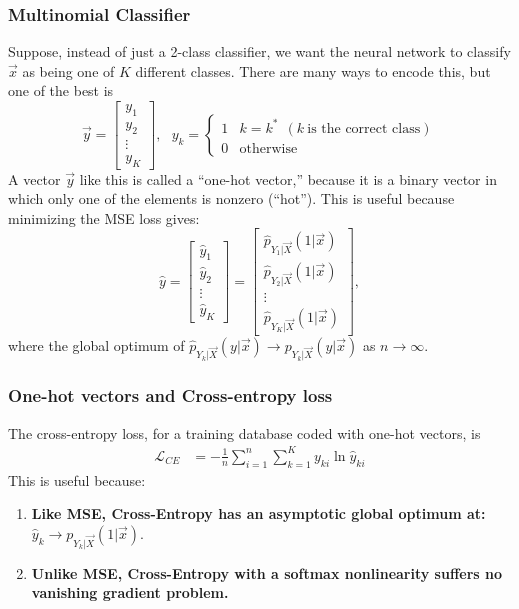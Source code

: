 \documentclass{beamer}
\begin{document}
\begin{frame}
  \frametitle{Multinomial Classifier}

  Suppose, instead of just a 2-class classifier, we want the neural
  network to classify $\vec{x}$ as being one of $K$ different classes.
  There are many ways to encode this, but one of the best is
  \begin{displaymath}
    \vec{y}=\left[\begin{array}{c}y_1\\y_2\\\vdots\\y_K\end{array}\right],~~~
    y_k=\begin{cases}1&k=k^*~~(k~\mbox{is the correct class})\\0&\mbox{otherwise}\end{cases}
  \end{displaymath}
  A vector $\vec{y}$ like this is called a ``one-hot vector,'' because
  it is a binary vector in which only one of the elements is nonzero (``hot'').
  This is useful  because minimizing the MSE loss gives:
  \begin{displaymath}
    \hat{y}=\left[\begin{array}{c}\hat{y}_1\\\hat{y}_2\\\vdots\\\hat{y}_K\end{array}\right]
    =\left[\begin{array}{c}
        \hat{p}_{Y_1|\vec{X}}(1|\vec{x})\\
        \hat{p}_{Y_2|\vec{X}}(1|\vec{x})\\
        \vdots\\
        \hat{p}_{Y_K|\vec{X}}(1|\vec{x})
        \end{array}\right],
  \end{displaymath}
  where the global optimum of
  $\hat{p}_{Y_k|\vec{X}}(y|\vec{x})\rightarrow
  p_{Y_k|\vec{X}}(y|\vec{x})$ as $n\rightarrow\infty$.
\end{frame}

\begin{frame}
  \frametitle{One-hot vectors and Cross-entropy loss}
  
  The cross-entropy loss, for a training database coded with one-hot vectors, is
  \begin{align*}
    {\mathcal L}_{CE} &=-\frac{1}{n}\sum_{i=1}^n\sum_{k=1}^K y_{ki}\ln\hat{y}_{ki}
  \end{align*}
  This is useful because:
  \begin{enumerate}
  \item {\bf Like MSE, Cross-Entropy has an asymptotic global optimum at:}
    $\hat{y}_k\rightarrow p_{Y_k|\vec{X}}(1|\vec{x})$.
  \item {\bf Unlike MSE, Cross-Entropy with a softmax nonlinearity
    suffers no vanishing gradient problem.}
  \end{enumerate}
\end{frame}
\end{document}
